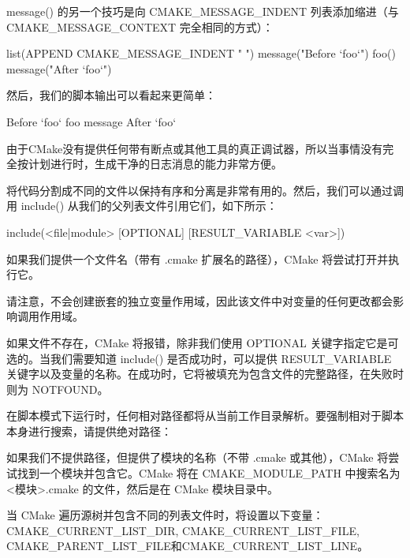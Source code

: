 message() 的另一个技巧是向 CMAKE\_MESSAGE\_INDENT 列表添加缩进（与 CMAKE\_MESSAGE\_CONTEXT 完全相同的方式）：

\begin{cmake}
list(APPEND CMAKE_MESSAGE_INDENT " ")
message("Before `foo`")
foo()
message("After `foo`")
\end{cmake}

然后，我们的脚本输出可以看起来更简单：

\begin{shell}
Before `foo`
    foo message
After `foo`
\end{shell}

由于CMake没有提供任何带有断点或其他工具的真正调试器，所以当事情没有完全按计划进行时，生成干净的日志消息的能力非常方便。


将代码分割成不同的文件以保持有序和分离是非常有用的。然后，我们可以通过调用 include() 从我们的父列表文件引用它们，如下所示：

\begin{shell}
include(<file|module> [OPTIONAL] [RESULT_VARIABLE <var>])
\end{shell}

如果我们提供一个文件名（带有 .cmake 扩展名的路径），CMake 将尝试打开并执行它。

请注意，不会创建嵌套的独立变量作用域，因此该文件中对变量的任何更改都会影响调用作用域。

如果文件不存在，CMake 将报错，除非我们使用 OPTIONAL 关键字指定它是可选的。当我们需要知道 include() 是否成功时，可以提供 RESULT\_VARIABLE 关键字以及变量的名称。在成功时，它将被填充为包含文件的完整路径，在失败时则为 NOTFOUND。

在脚本模式下运行时，任何相对路径都将从当前工作目录解析。要强制相对于脚本本身进行搜索，请提供绝对路径：


如果我们不提供路径，但提供了模块的名称（不带 .cmake 或其他），CMake 将尝试找到一个模块并包含它。CMake 将在 CMAKE\_MODULE\_PATH 中搜索名为 <模块>.cmake 的文件，然后是在 CMake 模块目录中。

当 CMake 遍历源树并包含不同的列表文件时，将设置以下变量： CMAKE\_CURRENT\_LIST\_DIR, CMAKE\_CURRENT\_LIST\_FILE, CMAKE\_PARENT\_LIST\_FILE和CMAKE\_CURRENT\_LIST\_LINE。


